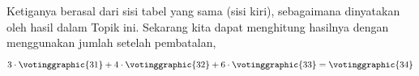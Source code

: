\begin{exercises}
\begin{answer}
\begin{center}
\begin{tabular}{|c|c|}
        \end{tabular}
       \end{center}
       \smallskip
       Ketiganya berasal dari sisi tabel yang sama (sisi kiri),
       sebagaimana dinyatakan oleh hasil dalam Topik ini.
       Sekarang kita dapat menghitung hasilnya dengan menggunakan jumlah setelah pembatalan,
       \begin{equation*}
         3\cdot \votinggraphic{31}
         +4\cdot\votinggraphic{32}
         +6\cdot\votinggraphic{33}
         = \votinggraphic{34}

\end{equation*}
\end{answer}
\end{exercises}

